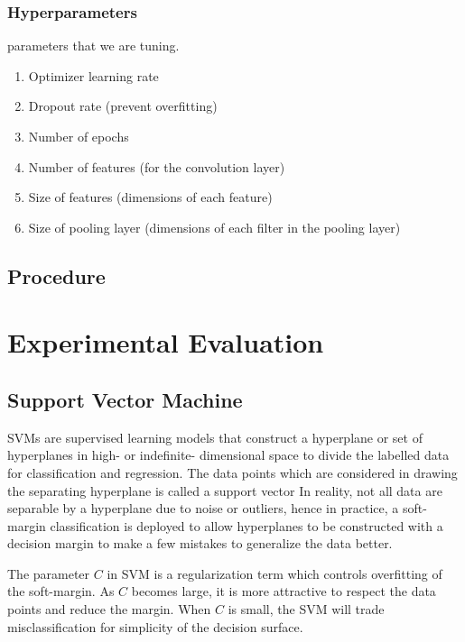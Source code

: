 \documentclass[letterpaper]{article}
\begin{document}
\subsubsection{Hyperparameters}
parameters that we are tuning.

\begin{enumerate}

    \item Optimizer learning rate

    \item Dropout rate (prevent overfitting)

    \item Number of epochs

    \item Number of features (for the convolution layer)

    \item Size of features (dimensions of each feature)

    \item Size of pooling layer (dimensions of each filter in the pooling layer)

\end{enumerate}



\subsection{Procedure}

\section{Experimental Evaluation}

\subsection{Support Vector Machine}
SVMs are supervised learning models that construct a hyperplane or set of hyperplanes in high-
or indefinite- dimensional space to divide the labelled data for classification and regression.
The data points which are considered in drawing the separating hyperplane is called a support
vector In reality, not all data are separable by a hyperplane due to noise or outliers, hence in
practice, a soft-margin classification is deployed to allow hyperplanes to be constructed
with a decision margin to make a few mistakes to generalize the data better.

The parameter $\textit{C}$ in SVM is a regularization term which controls overfitting of the soft-margin.
As $\textit{C}$ becomes large, it is more attractive to respect the data points and reduce
the margin. When $\textit{C}$ is small, the SVM will trade misclassification for simplicity
of the decision surface.
\end{document}

